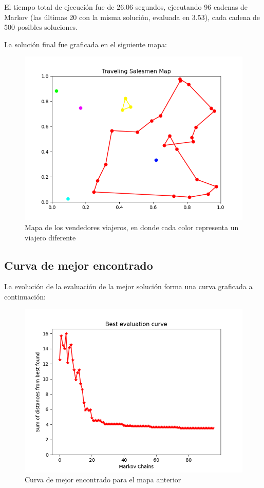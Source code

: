\documentclass[sigconf,authorversion,nonacm]{acmart}
\begin{document}
El tiempo total de ejecución fue de 26.06 segundos, ejecutando 96 cadenas de Markov (las últimas 20 con la misma solución, evaluada en 3.53), cada cadena de 500 posibles soluciones.

La solución final fue graficada en el siguiente mapa:

\begin{figure}[H]
  \centering
  \includegraphics[width=\linewidth]{map.png}
  \caption{Mapa de los vendedores viajeros, en donde cada color representa un viajero diferente}
\end{figure}

\subsection{Curva de mejor encontrado}
La evolución de la evaluación de la mejor solución forma una curva graficada a continuación:

\begin{figure}[H]
  \centering
  \includegraphics[width=\linewidth]{curve.png}
  \caption{Curva de mejor encontrado para el mapa anterior}
\end{figure}
\end{document}
